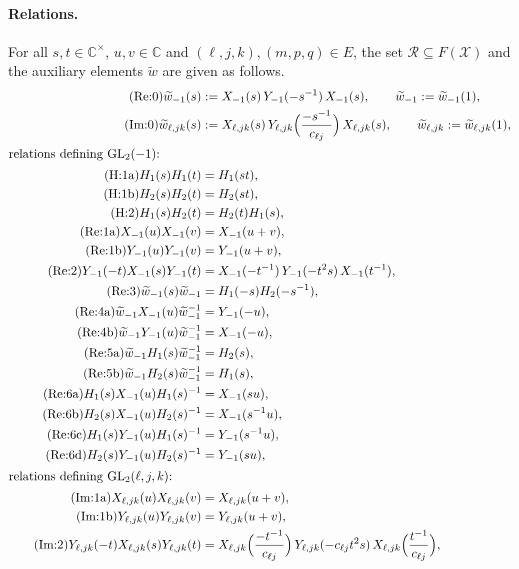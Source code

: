 \documentclass[11pt]{article}
\theoremstyle{definition}
\theoremstyle{remark}
\newcommand{\tw}{\widetilde{w}}
\newcommand{\Cx}{\mathbb{C}^{\times}}
\begin{document}
\paragraph{Relations.} For all $s,t\in\Cx$, $u,v\in\mathbb{C}$ and $(\ell,j,k),(m,p,q)\in E$, the set $\mathcal{R}\subseteq F(\mathcal{X})$ and the auxiliary elements $\tw$ are given as follows.
\begin{align*}
\tag{Re:0} \tw_{-1}(s)&:=X_{-1}(s)\,Y_{-1}(-s^{-1})\,X_{-1}(s),\qquad \tw_{-1}:=\tw_{-1}(1),\\
\tag{Im:0} \tw_{\ell,jk}(s)&:=X_{\ell,jk}(s)\,Y_{\ell,jk}\Big(\frac{-s^{-1}}{c_{\ell j}}\Big)\,X_{\ell,jk}(s),\qquad \tw_{\ell,jk}:=\tw_{\ell,jk}(1),\\
\intertext{relations defining $\mathrm{GL}_2(-1)$:}
\tag{H:1a} H_1(s)H_1(t)&=H_1(st),\\
\tag{H:1b} H_2(s)H_2(t)&=H_2(st),\\
\tag{H:2} H_1(s)H_2(t)&=H_2(t)H_1(s),\\
\tag{Re:1a} X_{-1}(u)X_{-1}(v)&=X_{-1}(u+v),\\
\tag{Re:1b} Y_{-1}(u)Y_{-1}(v)&=Y_{-1}(u+v),\\
\tag{Re:2} Y_{-1}(-t)X_{-1}(s)Y_{-1}(t)&=X_{-1}(-t^{-1})\,Y_{-1}(-t^{2}s)\,X_{-1}(t^{-1}),\\
\tag{Re:3} \tw_{-1}(s)\tw_{-1}&=H_1(-s)H_2(-s^{-1}),\\
\tag{Re:4a} \tw_{-1}X_{-1}(u)\tw_{-1}^{-1}&=Y_{-1}(-u),\\
\tag{Re:4b} \tw_{-1}Y_{-1}(u)\tw_{-1}^{-1}&=X_{-1}(-u),\\
\tag{Re:5a} \tw_{-1}H_1(s)\tw_{-1}^{-1}&=H_2(s),\\
\tag{Re:5b} \tw_{-1}H_2(s)\tw_{-1}^{-1}&=H_1(s),\\
\tag{Re:6a} H_1(s)X_{-1}(u)H_1(s)^{-1}&=X_{-1}(su),\\
\tag{Re:6b} H_2(s)X_{-1}(u)H_2(s)^{-1}&=X_{-1}(s^{-1}u),\\
\tag{Re:6c} H_1(s)Y_{-1}(u)H_1(s)^{-1}&=Y_{-1}(s^{-1}u),\\
\tag{Re:6d} H_2(s)Y_{-1}(u)H_2(s)^{-1}&=Y_{-1}(su),\\
\intertext{relations defining $\mathrm{GL}_2(\ell,j,k)$:}
\tag{Im:1a} X_{\ell,jk}(u)X_{\ell,jk}(v)&=X_{\ell,jk}(u+v),\\
\tag{Im:1b} Y_{\ell,jk}(u)Y_{\ell,jk}(v)&=Y_{\ell,jk}(u+v),\\
\tag{Im:2} Y_{\ell,jk}(-t)X_{\ell,jk}(s)Y_{\ell,jk}(t)&=X_{\ell,jk}\Big(\frac{-t^{-1}}{c_{\ell j}}\Big)\,Y_{\ell,jk}(-c_{\ell j}t^2s)\,X_{\ell,jk}\Big(\frac{t^{-1}}{c_{\ell j}}\Big),\\

\end{align*}
\end{document}
